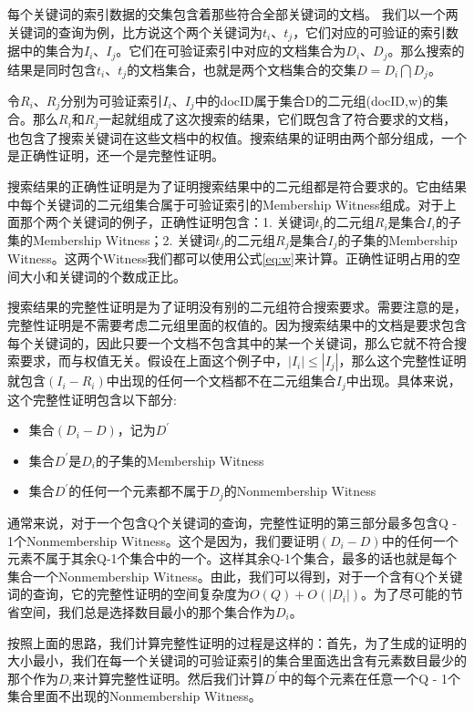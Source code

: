 每个关键词的索引数据的交集包含着那些符合全部关键词的文档。
我们以一个两关键词的查询为例，比方说这个两个关键词为$t_i$、$t_j$，它们对应的可验证的索引数据中的集合为$I_i$、$I_j$。它们在可验证索引中对应的文档集合为$D_i$、$D_j$。那么搜索的结果是同时包含$t_i$、$t_j$的文档集合，也就是两个文档集合的交集$D = D_i \bigcap D_j$。

令$R_i$、$R_j$分别为可验证索引$I_i$、$I_j$中的docID属于集合D的二元组(docID,w)的集合。那么$R_i$和$R_j$一起就组成了这次搜索的结果，它们既包含了符合要求的文档，也包含了搜索关键词在这些文档中的权值。搜索结果的证明由两个部分组成，一个是正确性证明，还一个是完整性证明。

搜索结果的正确性证明是为了证明搜索结果中的二元组都是符合要求的。它由结果中每个关键词的二元组集合属于可验证索引的Membership Witness组成。对于上面那个两个关键词的例子，正确性证明包含：1. 关键词$t_i$的二元组$R_i$是集合$I_i$的子集的Membership Witness；2. 关键词$t_j$的二元组$R_j$是集合$I_j$的子集的Membership Witness。这两个Witness我们都可以使用公式\ref{eq:w}来计算。正确性证明占用的空间大小和关键词的个数成正比。

搜索结果的完整性证明是为了证明没有别的二元组符合搜索要求。需要注意的是，完整性证明是不需要考虑二元组里面的权值的。因为搜索结果中的文档是要求包含每个关键词的，因此只要一个文档不包含其中的某一个关键词，那么它就不符合搜索要求，而与权值无关。假设在上面这个例子中，$|I_i| \le |I_j|$，那么这个完整性证明就包含$(I_i - R_i)$中出现的任何一个文档都不在二元组集合$I_j$中出现。具体来说，这个完整性证明包含以下部分:
\begin{itemize}
\item 集合$(D_i - D)$，记为$D^\prime$
\item 集合$D^\prime$是$D_i$的子集的Membership Witness
\item 集合$D^\prime$的任何一个元素都不属于$D_j$的Nonmembership Witness
\end{itemize}

通常来说，对于一个包含Q个关键词的查询，完整性证明的第三部分最多包含Q - 1个Nonmembership Witness。这个是因为，我们要证明$(D_i - D)$中的任何一个元素不属于其余Q-1个集合中的一个。这样其余Q-1个集合，最多的话也就是每个集合一个Nonmembership Witness。由此，我们可以得到，对于一个含有Q个关键词的查询，它的完整性证明的空间复杂度为$O(Q) + O(|D_i|)$。为了尽可能的节省空间，我们总是选择数目最小的那个集合作为$D_i$。

按照上面的思路，我们计算完整性证明的过程是这样的：首先，为了生成的证明的大小最小，我们在每一个关键词的可验证索引的集合里面选出含有元素数目最少的那个作为$D_i$来计算完整性证明。然后我们计算$D^\prime$中的每个元素在任意一个Q - 1个集合里面不出现的Nonmembership Witness。

